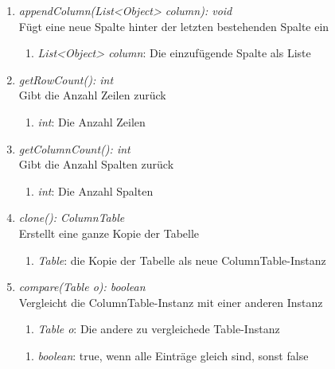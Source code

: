 \begin{enumerate}[+]
	\item \textit{appendColumn(List<Object> column): void} \\
	Fügt eine neue Spalte hinter der letzten bestehenden Spalte ein
	\begin{enumerate}[$\bullet$]
		\item \textit{List<Object> column}: Die einzufügende Spalte als Liste
	\end{enumerate}
	\vspace{-0.2cm}
	
	\item \textit{getRowCount(): int} \\
	Gibt die Anzahl Zeilen zurück
	\vspace{-0.2cm}
	\begin{enumerate}[$\circ$]
		\item \textit{int}: Die Anzahl Zeilen
	\end{enumerate}
	
	\item \textit{getColumnCount(): int} \\
	Gibt die Anzahl Spalten zurück
	\vspace{-0.2cm}
	\begin{enumerate}[$\circ$]
		\item \textit{int}: Die Anzahl Spalten
	\end{enumerate}
	
	\item \textit{clone(): ColumnTable} \\
	Erstellt eine ganze Kopie der Tabelle
	\vspace{-0.2cm}
	\begin{enumerate}[$\circ$]
		\item \textit{Table}: die Kopie der Tabelle als neue ColumnTable-Instanz
	\end{enumerate}
	
	\item \textit{compare(Table o): boolean} \\
	Vergleicht die ColumnTable-Instanz mit einer anderen Instanz
	\begin{enumerate}[$\bullet$]
		\item \textit{Table o}: Die andere zu vergleichede Table-Instanz
	\end{enumerate}
	\vspace{-0.2cm}
	\begin{enumerate}[$\circ$]
		\item \textit{boolean}: true, wenn alle Einträge gleich sind, sonst false
	\end{enumerate}
\end{enumerate}